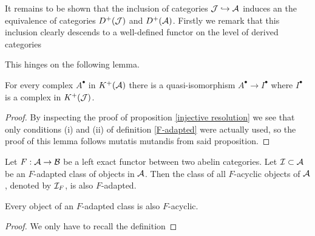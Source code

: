 It remains to be shown that the inclusion of categories $\mathcal J \hookrightarrow \mathcal A$ induces an the equivalence of categories $D^+(\mathcal J)$ and $D^+(\mathcal A)$. Firstly we remark that this inclusion clearly descends to a well-defined functor on the level of derived categories

This hinges on the following lemma.

\begin{lemma}
    \label{F-acyclic resolutions}
    For every complex $A^\bullet$ in $K^+(\mathcal A)$ there is a quasi-isomorphism $A^\bullet \to I^\bullet$ where $I^\bullet$ is a complex in $K^+(\mathcal J)$.
\end{lemma}

\begin{proof}
    By inspecting the proof of proposition \ref{injective resolution} we see that only conditions (i) and (ii) of definition \ref{F-adapted} were actually used, so the proof of this lemma follows mutatis mutandis from said proposition.
\end{proof}





\begin{proposition}
    \label{F-acyclic is F-adapted}
    Let $F : \mathcal A \to \mathcal B$ be a left exact functor between two abelin categories. Let $\mathcal I \subset \mathcal A$ be an $F$-adapted class of objects in $\mathcal A$. Then the class of all $F$-acyclic objects of $\mathcal A$, denoted by $\mathcal I_F$, is also $F$-adapted. 
\end{proposition}

\begin{lemma}
    \label{F-adapted is F-acyclic}
    Every object of an $F$-adapted class is also $F$-acyclic.
\end{lemma}

\begin{proof}
    We only have to recall the definition 
\end{proof}


